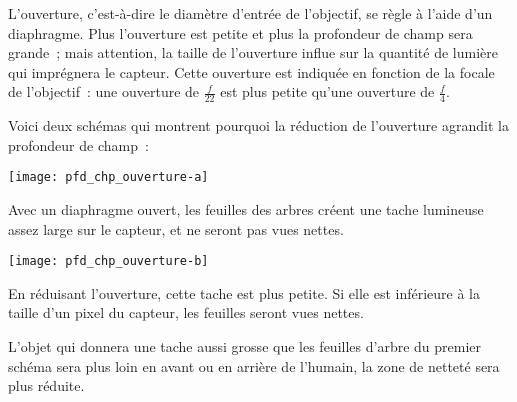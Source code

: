 \documentclass[../main/main.tex]{subfiles}
\begin{document}
L'ouverture, c'est-à-dire le diamètre d'entrée de l'objectif, se règle à l'aide
d'un diaphragme. Plus l'ouverture est petite et plus la profondeur de champ sera
grande~; mais attention, la taille de l'ouverture influe sur la quantité de
lumière qui imprégnera le capteur. Cette ouverture est indiquée en fonction de
la focale de l'objectif~: une ouverture de $\frac{f}{22}$ est plus petite qu'une
ouverture de $\frac{f}{4}$.

Voici deux schémas qui montrent pourquoi la réduction de l'ouverture agrandit la
profondeur de champ~:

\begin{minipage}{0.47\linewidth}
    \begin{center}
        \texttt{[image: pfd\_chp\_ouverture-a]}
    \end{center}
    Avec un diaphragme ouvert, les feuilles des arbres créent une tache
    lumineuse assez large sur le capteur, et ne seront pas vues nettes.
\end{minipage}
\hfill
\begin{minipage}{0.47\linewidth}
    \begin{center}
        \texttt{[image: pfd\_chp\_ouverture-b]}
    \end{center}
    En réduisant l'ouverture, cette tache est plus petite. Si elle est
    inférieure à la taille d'un pixel du capteur, les feuilles
    seront vues nettes.
\end{minipage}

\medskip

L'objet qui donnera une tache aussi grosse que les feuilles d'arbre du premier
schéma sera plus loin en avant ou en arrière de l'humain, la zone de netteté
sera plus réduite.
\end{document}
